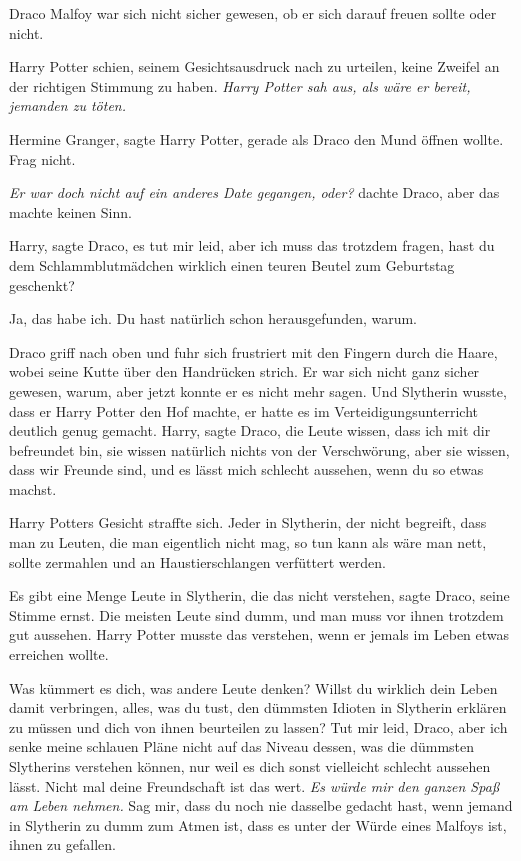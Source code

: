 Draco Malfoy war sich nicht sicher gewesen, ob er sich darauf freuen sollte oder
nicht.

Harry Potter schien, seinem Gesichtsausdruck nach zu urteilen, keine Zweifel an
der richtigen Stimmung zu haben. \emph{Harry Potter sah aus, als wäre er bereit,
jemanden zu töten.}

\glqq{}Hermine Granger\grqq{}, sagte Harry Potter, gerade als Draco den Mund
öffnen wollte. \glqq{}Frag nicht.\grqq{}

\emph{Er war doch nicht auf ein anderes Date gegangen, oder?} dachte Draco, aber
das machte keinen Sinn.

\glqq{}Harry\grqq{}, sagte Draco, \glqq{}es tut mir leid, aber ich muss das
trotzdem fragen, hast du dem Schlammblutmädchen wirklich einen teuren Beutel zum
Geburtstag geschenkt?\grqq{}

\glqq{}Ja, das habe ich. Du hast natürlich schon herausgefunden, warum.\grqq{}

Draco griff nach oben und fuhr sich frustriert mit den Fingern durch die Haare,
wobei seine Kutte über den Handrücken strich. Er war sich nicht ganz sicher
gewesen, warum, aber jetzt konnte er es nicht mehr sagen. Und Slytherin wusste,
dass er Harry Potter den Hof machte, er hatte es im Verteidigungsunterricht
deutlich genug gemacht. \glqq{}Harry\grqq{}, sagte Draco, \glqq{}die Leute
wissen, dass ich mit dir befreundet bin, sie wissen natürlich nichts von der
Verschwörung, aber sie wissen, dass wir Freunde sind, und es lässt mich schlecht
aussehen, wenn du so etwas machst.\grqq{}

Harry Potters Gesicht straffte sich. \glqq{}Jeder in Slytherin, der nicht
begreift, dass man zu Leuten, die man eigentlich nicht mag, so tun kann als wäre
man nett, sollte zermahlen und an Haustierschlangen verfüttert werden.\grqq{}

\glqq{}Es gibt eine Menge Leute in Slytherin, die das nicht verstehen\grqq{},
sagte Draco, seine Stimme ernst. \glqq{}Die meisten Leute sind dumm, und man
muss vor ihnen trotzdem gut aussehen.\grqq{} Harry Potter musste das verstehen,
wenn er jemals im Leben etwas erreichen wollte.

\glqq{}Was kümmert es dich, was andere Leute denken? Willst du wirklich dein
Leben damit verbringen, alles, was du tust, den dümmsten Idioten in Slytherin
erklären zu müssen und dich von ihnen beurteilen zu lassen? Tut mir leid, Draco,
aber ich senke meine schlauen Pläne nicht auf das Niveau dessen, was die
dümmsten Slytherins verstehen können, nur weil es dich sonst vielleicht schlecht
aussehen lässt. Nicht mal deine Freundschaft ist das wert. \emph{Es würde mir
den ganzen Spaß am Leben nehmen.} Sag mir, dass du noch nie dasselbe gedacht
hast, wenn jemand in Slytherin zu dumm zum Atmen ist, dass es unter der Würde
eines Malfoys ist, ihnen zu gefallen.\grqq{}

